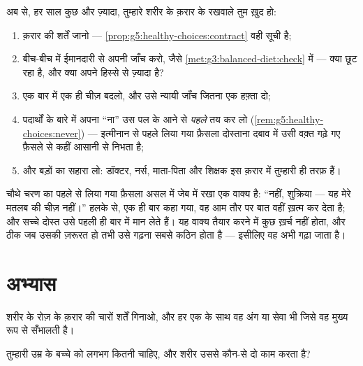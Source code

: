 \begin{method}[अपना क़रार ख़ुद चलाना]\label{met:g5:healthy-choices:run}
अब से, हर साल कुछ और ज़्यादा, तुम्हारे शरीर के क़रार के रखवाले तुम ख़ुद
हो:
\begin{enumerate}
  \item क़रार की शर्तें जानो ---
        \cref{prop:g5:healthy-choices:contract} वही सूची है;
  \item बीच-बीच में ईमानदारी से अपनी जाँच करो, जैसे
        \cref{met:g3:balanced-diet:check} में --- क्या छूट रहा है,
        और क्या अपने हिस्से से ज़्यादा है?
  \item एक बार में एक ही चीज़ बदलो, और उसे न्यायी जाँच जितना एक हफ़्ता
        दो;
  \item पदार्थों के बारे में अपना ``ना'' उस पल के आने से
        \emph{पहले} तय कर लो
        (\cref{rem:g5:healthy-choices:never}) --- इत्मीनान से पहले
        लिया गया फ़ैसला दोस्ताना दबाव में उसी वक़्त गढ़े गए फ़ैसले से
        कहीं आसानी से निभता है;
  \item और बड़ों का सहारा लो: डॉक्टर, नर्स, माता-पिता और शिक्षक इस
        क़रार में तुम्हारी ही तरफ़ हैं।
\end{enumerate}
\end{method}

\begin{example}[तैयार उत्तर]\label{ex:g5:healthy-choices:answers}
चौथे चरण का पहले से लिया गया फ़ैसला असल में जेब में रखा एक वाक्य है:
``नहीं, शुक्रिया --- यह मेरे मतलब की चीज़ नहीं।'' हलके से, एक ही बार
कहा गया, वह आम तौर पर बात वहीं ख़त्म कर देता है; और सच्चे दोस्त उसे
पहली ही बार में मान लेते हैं। यह वाक्य तैयार करने में कुछ ख़र्च नहीं
होता, और ठीक जब उसकी ज़रूरत हो तभी उसे गढ़ना सबसे कठिन होता है ---
इसीलिए वह अभी गढ़ा जाता है।
\end{example}

\section{अभ्यास}

\begin{exercise}[$\star$]\label{exo:g5:healthy-choices:1}
शरीर के रोज़ के क़रार की चारों शर्तें गिनाओ, और हर एक के साथ वह अंग या
सेवा भी जिसे वह मुख्य रूप से सँभालती है।
\end{exercise}

\begin{exercise}[$\star$]\label{exo:g5:healthy-choices:2}
तुम्हारी उम्र के बच्चे को लगभग कितनी  चाहिए, और शरीर उससे कौन-से दो
काम करता है?
\end{exercise}

